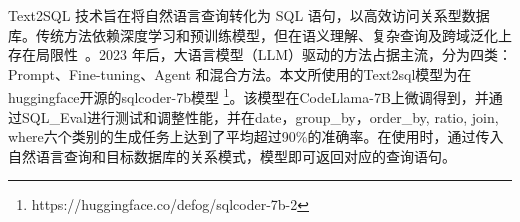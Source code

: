 \begin{CJK*}{UTF8}{song}

Text2SQL 技术旨在将自然语言查询转化为 SQL 语句，以高效访问关系型数据库。传统方法依赖深度学习和预训练模型，但在语义理解、复杂查询及跨域泛化上存在局限性~\cite{3}。2023 年后，大语言模型（LLM）驱动的方法占据主流，分为四类：Prompt、Fine-tuning、Agent 和混合方法。本文所使用的Text2sql模型为在huggingface开源的sqlcoder-7b模型 \footnote{https://huggingface.co/defog/sqlcoder-7b-2}。该模型在CodeLlama-7B上微调得到，并通过SQL\_Eval进行测试和调整性能，并在date，group\_by，order\_by, ratio, join, where六个类别的生成任务上达到了平均超过90\%的准确率。在使用时，通过传入自然语言查询和目标数据库的关系模式，模型即可返回对应的查询语句。

\end{CJK*}